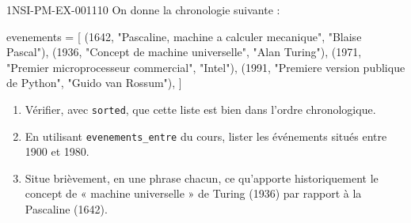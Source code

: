 \begin{exercice}{1NSI-PM-EX-001}{1}{10}
On donne la chronologie suivante :
\begin{python}
evenements = [
    (1642, "Pascaline, machine a calculer mecanique", "Blaise Pascal"),
    (1936, "Concept de machine universelle", "Alan Turing"),
    (1971, "Premier microprocesseur commercial", "Intel"),
    (1991, "Premiere version publique de Python", "Guido van Rossum"),
]
\end{python}
\begin{enumerate}
  \item Vérifier, avec \lstinline{sorted}, que cette liste est bien dans l'ordre chronologique.
  \item En utilisant \lstinline{evenements_entre} du cours, lister les événements situés entre 1900 et 1980.
  \item Situe brièvement, en une phrase chacun, ce qu'apporte historiquement le concept de « machine universelle » de Turing (1936) par rapport à la Pascaline (1642).
\end{enumerate}
\end{exercice}
